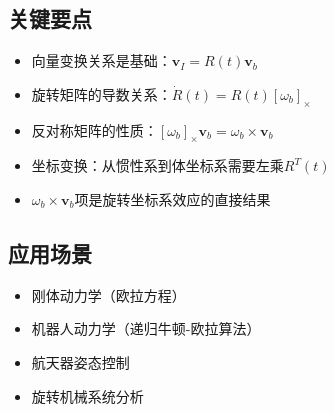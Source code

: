 \documentclass[12pt,a4paper]{article}
\begin{document}
\subsection{关键要点}

\begin{itemize}
\item 向量变换关系是基础：$\bm{v}_I = R(t) \bm{v}_b$
\item 旋转矩阵的导数关系：$\dot{R}(t) = R(t) [\omega_b]_{\times}$
\item 反对称矩阵的性质：$[\omega_b]_{\times} \bm{v}_b = \omega_b \times \bm{v}_b$
\item 坐标变换：从惯性系到体坐标系需要左乘$R^T(t)$
\item $\omega_b \times \bm{v}_b$项是旋转坐标系效应的直接结果
\end{itemize}

\subsection{应用场景}

\begin{itemize}
\item 刚体动力学（欧拉方程）
\item 机器人动力学（递归牛顿-欧拉算法）
\item 航天器姿态控制
\item 旋转机械系统分析
\end{itemize}
\end{document}
